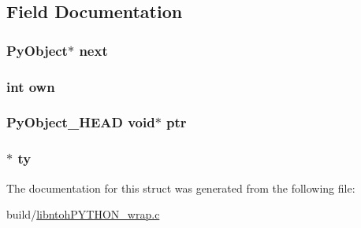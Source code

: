 \subsection{Field Documentation}
\hypertarget{struct_swig_py_object_a6ff221eaf6fa7553a0d69c6caad8c815}{
\subsubsection[{next}]{\setlength{\rightskip}{0pt plus 5cm}Py\-Object$\ast$ next}}\label{struct_swig_py_object_a6ff221eaf6fa7553a0d69c6caad8c815}
\hypertarget{struct_swig_py_object_a4047a08438f6fec73854d5e936100de0}{
\subsubsection[{own}]{\setlength{\rightskip}{0pt plus 5cm}int own}}\label{struct_swig_py_object_a4047a08438f6fec73854d5e936100de0}
\hypertarget{struct_swig_py_object_a43cee60913250bcaf1ed538ea443a0a7}{
\subsubsection[{ptr}]{\setlength{\rightskip}{0pt plus 5cm}Py\-Object\-\_\-\-H\-E\-A\-D void$\ast$ ptr}}\label{struct_swig_py_object_a43cee60913250bcaf1ed538ea443a0a7}
\hypertarget{struct_swig_py_object_a6b6270e5da3083fb1e9476b22a0611ad}{
\subsubsection[{ty}]{$\ast$ ty}}\label{struct_swig_py_object_a6b6270e5da3083fb1e9476b22a0611ad}


The documentation for this struct was generated from the following file\-:\begin{DoxyCompactItemize}
\item 
build/\hyperlink{libntoh_p_y_t_h_o_n__wrap_8c}{libntoh\-P\-Y\-T\-H\-O\-N\-\_\-wrap.\-c}\end{DoxyCompactItemize}
